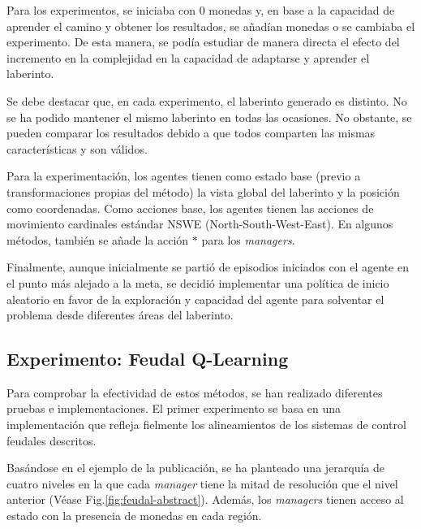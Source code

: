 \documentclass[letterpaper]{article} %
\begin{document}
Para los experimentos, se iniciaba con 0 monedas y, en base a la capacidad de aprender el camino y obtener los resultados, se añadían monedas o se cambiaba el experimento.
De esta manera, se podía estudiar de manera directa el efecto del incremento en la complejidad en la capacidad de adaptarse y aprender el laberinto. 

Se debe destacar que, en cada experimento, el laberinto generado es distinto. No se ha podido mantener el mismo laberinto en todas las ocasiones. No obstante,
se pueden comparar los resultados debido a que todos comparten las mismas características y son válidos.

Para la experimentación, los agentes tienen como estado base (previo a transformaciones propias del método) la vista global del laberinto y la posición como coordenadas. 
Como acciones base, los agentes tienen las acciones de movimiento cardinales estándar NSWE (North-South-West-East). En algunos métodos, 
también se añade la acción $*$ para los \textit{managers}.

Finalmente, aunque inicialmente se partió de episodios iniciados con el agente en el punto más alejado a la meta, se decidió implementar una política de inicio aleatorio en favor de la exploración y capacidad del agente para solventar el problema desde diferentes áreas del laberinto.

\subsection{Experimento: Feudal Q-Learning}
Para comprobar la efectividad de estos métodos, se han realizado diferentes pruebas e implementaciones. El primer experimento
se basa en una implementación que refleja fielmente los alineamientos de los sistemas de control feudales descritos. 

Basándose en el ejemplo de la publicación, se ha planteado una jerarquía de cuatro niveles en la que cada \textit{manager} tiene la mitad de resolución 
que el nivel anterior (Véase Fig.\ref{fig:feudal-abstract}). Además, los \textit{managers} tienen acceso al estado con la presencia de monedas en cada región.  
\end{document}
